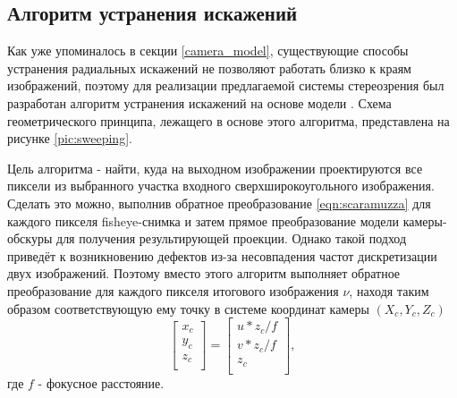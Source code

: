 \subsection{Алгоритм устранения искажений}

Как уже упоминалось в секции \ref{camera_model}, существующие способы устранения радиальных искажений не
позволяют работать близко к краям изображений, поэтому для реализации предлагаемой системы стереозрения     %
был разработан алгоритм устранения искажений на основе модели \cite{scaramuzza}. Схема геометрического
принципа, лежащего в основе этого алгоритма, представлена на рисунке \ref{pic:sweeping}.


Цель алгоритма - найти, куда на выходном изображении проектируются все пиксели из выбранного участка входного 
сверхширокоугольного изображения. Сделать это можно, выполнив обратное преобразование \ref{eqn:scaramuzza} для каждого пикселя 
fisheye-снимка и затем прямое преобразование модели камеры-обскуры для получения результирующей проекции. Однако такой подход 
приведёт к возникновению дефектов из-за несовпадения частот дискретизации двух изображений.                 %
Поэтому вместо этого алгоритм выполняет обратное преобразование  для каждого пикселя итогового изображения $\nu$, 
находя таким образом соответствующую ему точку в системе координат камеры $({X_c, Y_c, Z_c})$ 
\begin{equation}
    \label{eq:uv_to_xyz}
    \left[\begin{matrix}x_c\\y_c\\z_c\\\end{matrix}\right] = \left[\begin{matrix} {u*z_c}/f \\  {v*z_c}/f \\ z_c \\\end{matrix}\right],
\end{equation} 
где  $f$ - фокусное расстояние. 

